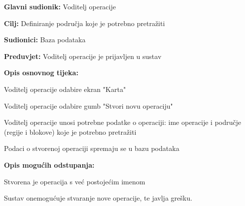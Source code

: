 					\begin{packed_item}
	
						\item \textbf{Glavni sudionik: }Voditelj operacije
						\item  \textbf{Cilj:} Definiranje područja koje je potrebno pretražiti
						\item  \textbf{Sudionici:} Baza podataka
						\item  \textbf{Preduvjet:} Voditelj operacije je prijavljen u sustav
						\item  \textbf{Opis osnovnog tijeka:}
						
						\item[] \begin{packed_enum}
	
							\item Voditelj operacije odabire ekran "Karta"  
							\item Voditelj operacije odabire gumb "Stvori novu operaciju"
							\item Voditelj operacije unosi potrebne podatke o operaciji: ime operacije i područje (regije i blokove) koje je potrebno pretražiti
							\item Podaci o stvorenoj operaciji spremaju se u bazu podataka
						\end{packed_enum}
						
						\item  \textbf{Opis mogućih odstupanja:}
						
						\item[] \begin{packed_item}
	
							\item[2.a] Stvorena je operacija s već postojećim imenom
							\item[] \begin{packed_enum}
								
								\item Sustav onemogućuje stvaranje nove operacije, te javlja grešku.

							\end{packed_enum}
							
						\end{packed_item}
					\end{packed_item}
					\noindent {}
